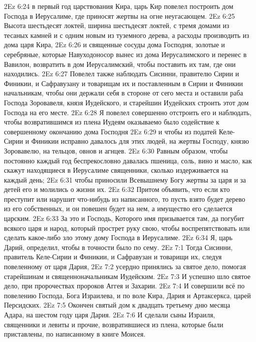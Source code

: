 \vs 2Ez 6:24 в первый год царствования Кира, царь Кир повелел построить дом Господа в Иерусалиме, где приносят жертвы на огне неугасающем.
\vs 2Ez 6:25 Высота  шестьдесят локтей, ширина шестьдесят локтей, с тремя домами из тесаных камней и с одним новым из туземного дерева, а расходы производить из дома царя Кира,
\vs 2Ez 6:26 и священные сосуды дома Господня, золотые и серебряные, которые Навуходоносор вынес из дома Иерусалимского и перенес в Вавилон, возвратить в дом Иерусалимский, чтобы поставить их там, где они находились.
\vs 2Ez 6:27 Повелел также наблюдать Сисинни, правителю Сирии и Финикии, и Сафравузану и товарищам их и поставленным в Сирии и Финикии начальникам, чтобы они держали себя в стороне от сего места и оставили раба Господа Зоровавеля, князя Иудейского, и старейшин Иудейских строить этот дом Господа на его месте.
\vs 2Ez 6:28 Я повелел совершенно отстроить его и наблюдать, чтобы возвратившимся из плена Иудеям оказываемо было содействие к совершенному окончанию дома Господня
\vs 2Ez 6:29 и чтобы из податей Келе-Сирии и Финикии исправно давалось для этих людей, на жертвы Господу, князю Зоровавелю, на тельцов, овнов и агнцев.
\vs 2Ez 6:30 Равным образом, чтобы постоянно каждый год беспрекословно давалась пшеница, соль, вино и масло, как скажут находящиеся в Иерусалиме священники, сколько издерживается на каждый день;
\vs 2Ez 6:31 чтобы приносили Всевышнему Богу жертвы за царя и за детей его и молились о жизни их.
\vs 2Ez 6:32 Притом объявить, что если кто преступит или нарушит что-нибудь из написанного, то пусть взято будет дерево из его собственных, и он повешен будет на нем, а имущество его сделается царским.
\vs 2Ez 6:33 За это и Господь, Которого имя призывается там, да погубит всякого царя и народ, который прострет руку свою, чтобы воспрепятствовать или сделать какое-либо зло этому дому Господа в Иерусалиме.
\vs 2Ez 6:34 Я, царь Дарий, определил, чтобы в точности было по сему.
\vs 2Ez 7:1 Тогда Сисинни, правитель Келе-Сирии и Финикии, и Сафравузан и товарищи их, следуя повеленному от царя Дария,
\vs 2Ez 7:2 усердно принялись за святое дело, помогая старейшинам и священноначальникам Иудейским.
\vs 2Ez 7:3 И успешно шло святое дело, при пророчествах пророков Аггея и Захарии.
\vs 2Ez 7:4 И совершили всё по повелению Господа, Бога Израилева, и по воле Кира, Дария и Артаксеркса, царей Персидских.
\rsbpar\vs 2Ez 7:5 Окончен святый дом к двадцать третьему дню месяца Адара, на шестом году царя Дария.
\vs 2Ez 7:6 И сделали сыны Израиля, священники и левиты и прочие, возвратившиеся из плена, которые были приставлены,  по написанному в книге Моисея.
